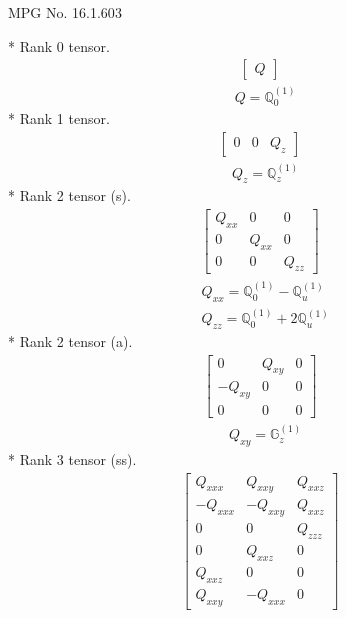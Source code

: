 \documentclass[fleqn,8pt,landscape]{jsarticle}
\begin{document}
\setcounter{MaxMatrixCols}{32}

\renewcommand{\tablename}{Table~}
\renewcommand{\figurename}{Figure~}
\begin{center}
\LARGE
MPG No. 16.1.60\quad$3$
\end{center}
* Rank 0 tensor.
\begin{align*}
\begin{bmatrix} Q \end{bmatrix}
\end{align*}
\begin{align*}
& Q = \mathbb{Q}_{0}^{(1)}
\end{align*}
* Rank 1 tensor.
\begin{align*}
\begin{bmatrix} 0 & 0 & Q_{z} \end{bmatrix}
\end{align*}
\begin{align*}
& Q_{z} = \mathbb{Q}_{z}^{(1)}
\end{align*}
* Rank 2 tensor (s).
\begin{align*}
\begin{bmatrix} Q_{xx} & 0 & 0 \\ 0 & Q_{xx} & 0 \\ 0 & 0 & Q_{zz} \end{bmatrix}
\end{align*}
\begin{align*}
& Q_{xx} = \mathbb{Q}_{0}^{(1)} - \mathbb{Q}_{u}^{(1)} \\
& Q_{zz} = \mathbb{Q}_{0}^{(1)} + 2 \mathbb{Q}_{u}^{(1)}
\end{align*}
* Rank 2 tensor (a).
\begin{align*}
\begin{bmatrix} 0 & Q_{xy} & 0 \\ - Q_{xy} & 0 & 0 \\ 0 & 0 & 0 \end{bmatrix}
\end{align*}
\begin{align*}
& Q_{xy} = \mathbb{G}_{z}^{(1)}
\end{align*}
* Rank 3 tensor (ss).
\begin{align*}
\begin{bmatrix} Q_{xxx} & Q_{xxy} & Q_{xxz} \\ - Q_{xxx} & - Q_{xxy} & Q_{xxz} \\ 0 & 0 & Q_{zzz} \\ 0 & Q_{xxz} & 0 \\ Q_{xxz} & 0 & 0 \\ Q_{xxy} & - Q_{xxx} & 0 \end{bmatrix}
\end{align*}
\end{document}
